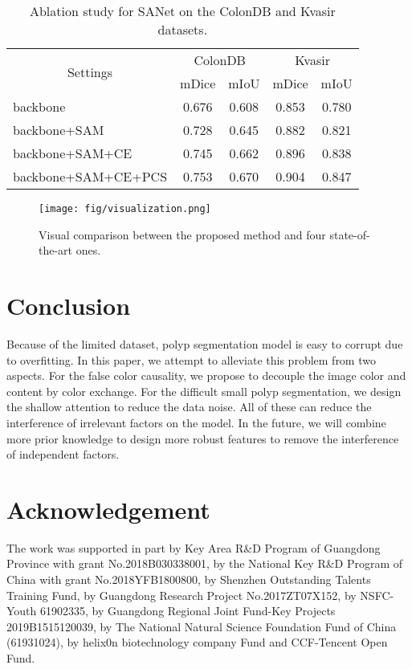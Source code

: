 \documentclass[runningheads]{llncs}
\begin{document}
\begin{table}[t]
  \caption{Ablation study for SANet on the ColonDB and Kvasir datasets.}
  \label{tab:ablation}
  \renewcommand\tabcolsep{10pt}
  \renewcommand\arraystretch{1.1}
  \centering
  \begin{tabular}{l|cc|cc}
    \hline
    \multicolumn{1}{c|}{\multirow{2}{*}{Settings}} & \multicolumn{2}{c|}{ColonDB} & \multicolumn{2}{c}{Kvasir}    \\
    \multicolumn{1}{c|}{}                         & mDice   & mIoU    & mDice   & mIoU    \\
    \hline
    backbone                                      & 0.676   & 0.608   & 0.853   & 0.780 \\
    backbone+SAM                                  & 0.728   & 0.645   & 0.882   & 0.821 \\
    backbone+SAM+CE                               & 0.745   & 0.662   & 0.896   & 0.838 \\
    backbone+SAM+CE+PCS                           & 0.753   & 0.670   & 0.904   & 0.847 \\
    \hline
  \end{tabular}
\end{table}

\begin{figure}
  \centering
  \texttt{[image: fig/visualization.png]}
  \caption{Visual comparison between the proposed method and four state-of-the-art ones.}
  \label{fig:visualization}
\end{figure}

\section{Conclusion}
Because of the limited dataset, polyp segmentation model is easy to corrupt due to overfitting. In this paper, we attempt to alleviate this problem from two aspects. For the false color causality, we propose to decouple the image color and content by color exchange. For the difficult small polyp segmentation, we design the shallow attention to reduce the data noise. All of these can reduce the interference of irrelevant factors on the model. In the future, we will combine more prior knowledge to design more robust features to remove the interference of independent factors.

\section{Acknowledgement}
The work was supported in part by Key Area R\&D Program of Guangdong Province with grant No.2018B030338001, by the National Key R\&D Program of China with grant No.2018YFB1800800, by Shenzhen Outstanding Talents Training Fund, by Guangdong Research Project No.2017ZT07X152, by NSFC-Youth 61902335, by Guangdong Regional Joint Fund-Key Projects 2019B1515120039, by The National Natural Science Foundation Fund of China (61931024), by helix0n biotechnology company Fund and CCF-Tencent Open Fund.



\end{document}
